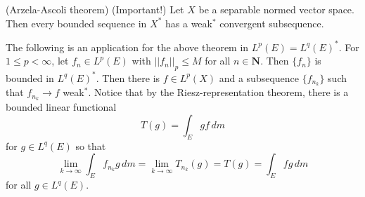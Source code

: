 \vspace{2ex}
\begin{thm}
(Arzela-Ascoli theorem) (Important!) Let $X$ be a separable normed vector space. Then every bounded sequence in $X^{*}$ has a weak$^{*}$ convergent subsequence.  
\end{thm}
\vspace{2ex}
\begin{cor}
The following is an application for the above theorem in $L^{p}(E)=L^{q}(E)^{*}$. For $1\leq p<\infty $, let $f_{n}\in L^{p}(E)$ with $||f_{n}||_{p}\leq M$ for all $n\in {\bm N}$. Then $\{f_{n}\}$ is bounded in $L^{q}(E)^{*}$. Then there is $f\in L^{p}(X)$ and a subsequence $\{f_{n_{k}}\}$ such that $f_{n_{k}}\rightarrow f$ weak$^{*}$. Notice that by the Riesz-representation theorem, there is a bounded linear functional\[T(g)=\int _{E}gf\,dm\]
for $g\in L^{q}(E)$ so that
\[\lim _{k\rightarrow \infty }\int _{E}f_{n_{k}}g\,d m=\lim _{k\rightarrow \infty }T_{n_{k}}(g)=T(g)=\int _{E}fg\,d m\]
for all $g\in L^{q}(E)$. 
\end{cor}
\vspace{2ex}

